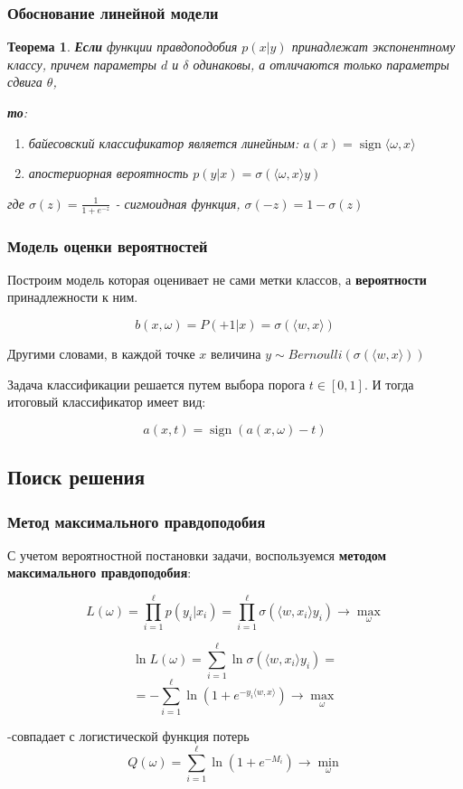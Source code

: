 \documentclass{beamer}
\newtheorem{rustheorem}{Теорема}
\DeclareMathOperator{\sign}{sign}
\begin{document}
	\begin{frame}
		\frametitle{Обоснование линейной модели}
		
		\begin{rustheorem}
		\textbf{Если} функции правдоподобия $p(x | y) $ принадлежат экспонентному классу, причем параметры $d$ и $\delta$ одинаковы, а отличаются только параметры сдвига $\theta$, 
		
		\textbf{то}:
		\begin{enumerate}
			\item байесовский классификатор является линейным: $a(x) = \sign \langle \omega, x \rangle$
			\item апостериорная вероятность $p(y | x) = \sigma(\langle \omega, x \rangle y)$
		\end{enumerate}
		
		где $\sigma(z) = \frac{1}{1 + e^{-z}}$ - сигмоидная функция, $\sigma(-z) = 1 - \sigma(z)$
		\end{rustheorem}	
	\end{frame}
	
	\begin{frame}
		\frametitle{Модель оценки вероятностей}
		Построим модель которая оценивает не сами метки классов, а \textbf{вероятности} принадлежности к ним.
		
		\[
		b(x, \omega) = P(+1 | x) = \sigma(\langle w, x \rangle)
		\]
		
		Другими словами, в каждой точке $x$ величина $y \sim Bernoulli(\sigma(\langle w, x \rangle))$
		
		\vspace{15pt}
		
		Задача классификации решается путем выбора порога $t \in [0, 1]$. И тогда итоговый классификатор имеет вид:
		
		\[
		a(x, t) = \sign (a(x, \omega) - t)
		\]
		
	\end{frame}
	
	\subsection{Поиск решения}
	
	\begin{frame}
		\frametitle{Метод максимального правдоподобия}
		С учетом вероятностной постановки задачи, воспользуемся \textbf{методом максимального правдоподобия}:
		
		\[
		L(\omega) = \prod_{i=1}^{\ell} p(y_i | x_i) = 
		\prod_{i=1}^{\ell} \sigma(\langle w, x_i \rangle y_i)
		\rightarrow \max_{\omega}
		\]
		
		\[
		\ln L(\omega) 
		= \sum_{i=1}^{\ell} \ln \sigma(\langle w, x_i \rangle y_i)
		=
		\]
		\[
		= 
		- \sum_{i=1}^{\ell} \ln(1 + e^{-y_i \langle w, x \rangle}) \rightarrow \max_{\omega}
		\]
		
		-совпадает с логистической функция потерь 
		\[
		Q(\omega) = \sum_{i=1}^{\ell} \ln (1 + e^{-M_i}) \rightarrow \min_{\omega}
		\]
	\end{frame}
	
\end{document}
